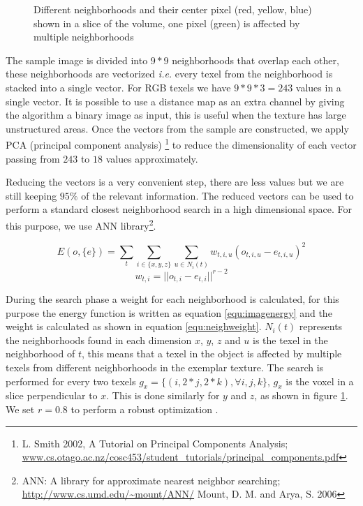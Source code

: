 \begin{figure}[!h]  
  \centering
   {}
  \caption{Different neighborhoods and their center pixel (red, yellow, blue) shown in a slice of the volume, one pixel (green) is affected by multiple neighborhoods}
  \label{fig:search_phase}  
 \end{figure}

The sample image is divided into $9*9$ neighborhoods that overlap each other, these neighborhoods are vectorized \emph{i.e.} 
every texel from the neighborhood is stacked into a single vector. For RGB texels we have $9 * 9 * 3 = 243$ 
values in a single vector. It is possible to 
use a distance map as an extra channel by giving the algorithm a binary image as input, 
this is useful when the texture has large unstructured areas.
Once the vectors from the sample are constructed, we apply PCA 
(principal component analysis) \footnote{L. Smith 2002, A Tutorial on Principal Components Analysis; \url{www.cs.otago.ac.nz/cosc453/student_tutorials/principal_components.pdf}}
to reduce the dimensionality of each vector passing from $243$ to $18$ values approximately.

Reducing the vectors is a very convenient step, there are less values but we are still keeping $95\%$ of the relevant information.
The reduced vectors can be used to perform a standard closest neighborhood search in a high dimensional space. 
For this purpose, we use ANN library\footnote{ANN: A library for approximate nearest neighbor searching; \url{http://www.cs.umd.edu/~mount/ANN/} Mount, D. M. and Arya, S. 2006}.

\begin{equation}
 E(o, \{e\} ) = \sum_{t} \sum_{i \in \{x, y, z\}} \sum_{u \in N_i(t)} w_{t, i, u} ( o_{t, i, u} - e_{t, i, u} )^2
 \label{equ:imagenergy} 
\end{equation}
\begin{equation}
 w_{t,i} = || o_{t, i} - e_{t, i} ||^{r - 2}
 \label{equ:neighweight}
\end{equation}

During the search phase a weight for each neighborhood is calculated, for this purpose the energy function 
is written as equation \ref{equ:imagenergy} and the weight is calculated
as shown in equation \ref{equ:neighweight}. $N_i(t)$ represents the neighborhoods found in each dimension $x$, $y$, $z$ 
and $u$ is the texel in the neighborhood of $t$, this means that
a texel in the object is affected by multiple texels from different neighborhoods in the exemplar texture. 
The search is performed for every two texels $g_x = \{(i, 2 * j, 2 * k), \forall i, j, k \} $, $g_x$ 
is the voxel in a slice perpendicular to $x$. This is done similarly for $y$ and $z$, as shown in figure \ref{fig:search_phase}.
We set $r = 0.8$ to perform a robust optimization \cite{kwatra:2005:SIGGRAPH}.

